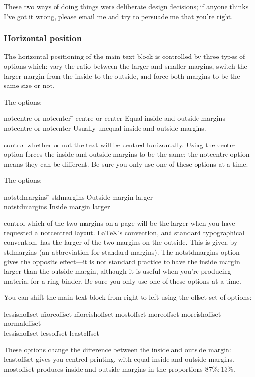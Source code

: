 \documentclass[11pt,loose,twoside,touchwider,longish,
                      noheaders,a4paper,notstdmargins]{report}
\newcommand*{\optname}[1]{{\ttfamily #1}}
\begin{document}
These two ways of doing things were deliberate design decisions; if
anyone thinks I've got it wrong, please email me and try to persuade
me that you're right.

\subsubsection{Horizontal position}
\label{use:horizontalpos}

The horizontal positioning of the main text block is controlled by
three types of options which: vary the ratio between the larger and
smaller margins, switch the larger margin from the inside to the
outside, and force both margins to be the same size or not.

The options:
\begin{tabbing}
\optname{notcentre} or \optname{notcenter} \= \kill
\optname{centre} or \optname{center} \> Equal inside and outside
margins  \\
\optname{notcentre} or \optname{notcenter} \>  Usually unequal inside
and outside margins.
\end{tabbing}
control whether or not the text will be centred horizontally.  Using
the \optname{centre} option forces the inside and outside margins to be
the same; the \optname{notcentre} option means they can be different.
Be sure you only use one of these options at a time.

The options:
\begin{tabbing}
\optname{notstdmargins} \= \kill
\optname{stdmargins} \> Outside margin larger \\
\optname{notstdmargins} \> Inside margin larger
\end{tabbing}
control which of the two margins on a page will be the larger when you
have requested a \optname{notcentre}d layout.  \LaTeX's convention,
and standard typographical convention, has the larger of the two
margins on the outside.  This is given by \optname{stdmargins} (an
abbreviation for standard margins).  The \optname{notstdmargins}
option gives the opposite effect---it is not standard practice to have
the  inside margin larger than the outside margin, although it is
useful when you're producing material for a ring binder.
Be sure you only use one of these options at a time.



You can shift the main text block from right to left using the
\optname{offset} set of options:
\begin{tabbing}
\optname{lessishoffset} \=  \optname{moreoffset} \= \optname{moreishoffset}  \kill
\optname{mostoffset} \>   \optname{moreoffset} \> \optname{moreishoffset}\\
\optname{normaloffset}\\
\optname{lessishoffset} \>  \optname{lessoffset} \> \optname{leastoffset}\\
\end{tabbing}
These options change the difference between the inside and outside
margin: \optname{leastoffset} gives you centred printing, with equal
inside and outside margins.  \optname{mostoffset} produces inside and
outside margins in the proportions $87\% : 13\%$.
\end{document}
